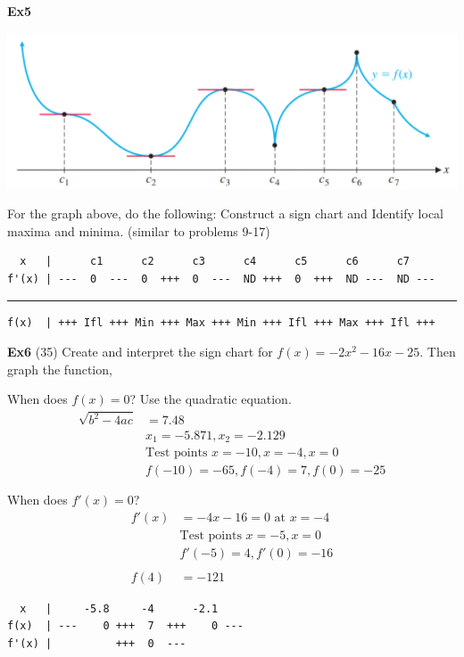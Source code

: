 \documentclass[14pt]{extarticle}
\begin{document}
\textbf{Ex5}
\begin{center}\includegraphics[width=1\linewidth]{11-1-3}\end{center}
\vspace{1em}
For the graph above, do the following: Construct a sign chart and Identify local maxima and minima. (similar to problems 9-17)
\begin{verbatim}
  x   |      c1      c2      c3      c4      c5      c6      c7
f'(x) | ---  0  ---  0  +++  0  ---  ND +++  0  +++  ND ---  ND ---
\end{verbatim}
\noindent\rule{\textwidth}{1pt}
\begin{verbatim}
f(x)  | +++ Ifl +++ Min +++ Max +++ Min +++ Ifl +++ Max +++ Ifl +++
\end{verbatim}
\vspace{1em}

\textbf{Ex6} (35) Create and interpret the sign chart for $f(x) = -2x^2 -16x -25$. Then graph the function,

When does $f(x) = 0$? Use the quadratic equation.
\begin{align*}
	\sqrt{b^2 -4ac} &= 7.48 \\
	&x_1 = -5.871, x_2=-2.129 \\
	& \text{Test points } x =-10, x=-4, x=0 \\
	&f(-10)= -65, f(-4) = 7, f(0)=-25 \\\\
\end{align*}
When does $f'(x) =0$?
\begin{align*}
	f'(x) &= -4x-16 =0 \text{ at } x=-4\\
	& \text{Test points } x =-5, x=0 \\
	&f'(-5)= 4, f'(0) = -16 \\\\
	f(4) &= -121
\end{align*}

\begin{verbatim}
  x   |     -5.8     -4      -2.1
f(x)  | ---    0 +++  7  +++    0 ---
f'(x) |          +++  0  ---         
\end{verbatim}
\end{document}
